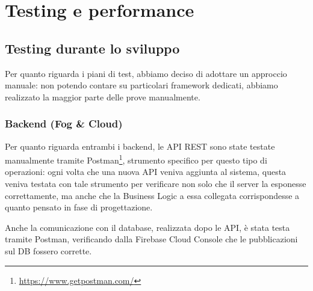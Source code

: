 \section{Testing e performance}





\subsection{Testing durante lo sviluppo}

Per quanto riguarda i piani di test, abbiamo deciso di adottare un approccio manuale:
non potendo contare su particolari framework dedicati, abbiamo realizzato la maggior parte delle prove manualmente.

\subsubsection[Backend]{Backend (Fog \& Cloud)}

Per quanto riguarda entrambi i backend, le API REST sono state testate manualmente tramite Postman\footnote{\url{https://www.getpostman.com/}}, strumento specifico per questo tipo di operazioni:
ogni volta che una nuova API veniva aggiunta al sistema, questa veniva
testata con tale strumento per verificare non solo che il server la esponesse correttamente,
ma anche che la Business Logic a essa collegata corrispondesse a quanto pensato in fase di progettazione.

Anche la comunicazione con il database, realizzata dopo le API, è stata testa tramite Postman, verificando dalla Firebase Cloud Console che le pubblicazioni sul DB fossero corrette.

